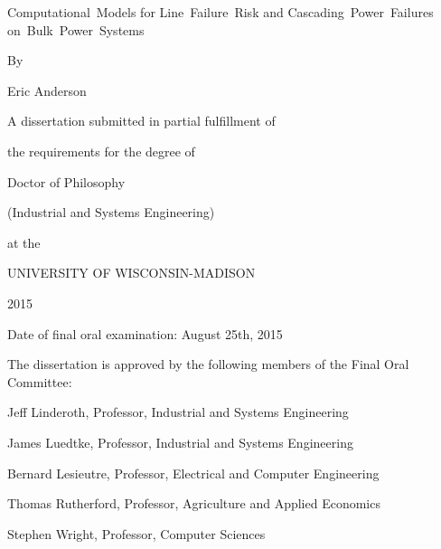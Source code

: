 \begin{titlepage}
    \begin{center}
        
Computational~Models for 
Line~Failure~Risk and Cascading~Power~Failures 
on~Bulk~Power~Systems
              
\vfill

        By

        Eric Anderson

        \vfill

        A dissertation submitted in partial fulfillment of

        the requirements for the degree of

        \vfill

        Doctor of Philosophy

        (Industrial and Systems Engineering)

        \vfill 

        at the

        UNIVERSITY OF WISCONSIN-MADISON

        2015

        \vfill

    \end{center}

    Date of final oral examination: August 25th, 2015


\singlespacing        
        The dissertation is approved by the following members of the Final Oral Committee:

        \hspace{20pt} Jeff Linderoth, Professor, Industrial and Systems Engineering

\hspace{20pt}         James Luedtke, Professor, Industrial and Systems Engineering

\hspace{20pt}         Bernard Lesieutre, Professor, Electrical and Computer Engineering

\hspace{20pt}         Thomas Rutherford, Professor, Agriculture and Applied Economics

\hspace{20pt}         Stephen Wright, Professor, Computer Sciences

\doublespacing
        

\end{titlepage}

